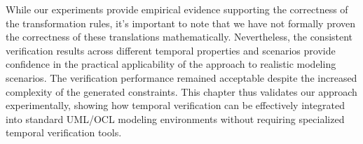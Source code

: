 While our experiments provide empirical evidence supporting the correctness of the 
transformation rules, it's important to note that we have not formally proven 
the correctness of these translations mathematically. Nevertheless, the consistent 
verification results across different temporal properties and scenarios provide 
confidence in the practical applicability of the approach to realistic modeling 
scenarios. The verification performance remained acceptable despite the increased 
complexity of the generated constraints. This chapter thus validates our approach 
experimentally, showing how temporal verification can be effectively integrated 
into standard UML/OCL modeling environments without requiring specialized temporal 
verification tools.

